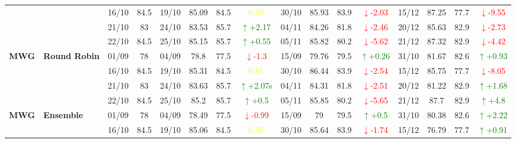 \documentclass{ieeeaccess}
\begin{document}
{\begin{longtable}{llcc|cccc|cccc|cccc}
&
& 16/10 & 84.5 & 19/10 & 85.09 & 84.5 & \textcolor{yellow}{0.59} & 30/10 & 85.93 & 83.9 & \textcolor{red}{\(\downarrow\)-2.03} & 15/12 & 87.25 & 77.7 & \textcolor{red}{\(\downarrow\)-9.55} \\

&
& 21/10 & 83 & 24/10 & 83.53 & 85.7 & \textcolor{green}{\(\uparrow\)+2.17} & 04/11 & 84.26 & 81.8 & \textcolor{red}{\(\downarrow\)-2.46} & 20/12 & 85.63 & 82.9 & \textcolor{red}{\(\downarrow\)-2.73} \\

&
& 22/10 & 84.5 & 25/10 & 85.15 & 85.7 & \textcolor{green}{\(\uparrow\)+0.55} & 05/11 & 85.82 & 80.2 & \textcolor{red}{\(\downarrow\)-5.62} & 21/12 & 87.32 & 82.9 & \textcolor{red}{\(\downarrow\)-4.42} \\
\midrule


\multirow{4}{*}{\textbf{MWG}} 
& \textbf{Round Robin}
& 01/09 & 78 & 04/09 & 78.8 & 77.5 & \textcolor{red}{\(\downarrow\)-1.3} & 15/09 & 79.76 & 79.5 & \textcolor{green}{\(\uparrow\)+0.26} & 31/10 & 81.67 & 82.6 & \textcolor{green}{\(\uparrow\)+0.93} \\

&
& 16/10 & 84.5 & 19/10 & 85.31 & 84.5 & \textcolor{yellow}{0.81} & 30/10 & 86.44 & 83.9 & \textcolor{red}{\(\downarrow\)-2.54} & 15/12 & 85.75 & 77.7 & \textcolor{red}{\(\downarrow\)-8.05} \\

&
& 21/10 & 83 & 24/10 & 83.63 & 85.7 & \textcolor{green}{\(\uparrow\)+2.07s} & 04/11 & 84.31 & 81.8 & \textcolor{red}{\(\downarrow\)-2.51} & 20/12 & 81.22 & 82.9 & \textcolor{green}{\(\uparrow\)+1.68} \\

&
& 22/10 & 84.5 & 25/10 & 85.2 & 85.7 & \textcolor{green}{\(\uparrow\)+0.5} & 05/11 & 85.85 & 80.2 & \textcolor{red}{\(\downarrow\)-5.65} & 21/12 & 87.7 & 82.9 & \textcolor{green}{\(\uparrow\)+4.8} \\
\midrule




\multirow{4}{*}{\textbf{MWG}} 
& \textbf{Ensemble}
& 01/09 & 78 & 04/09 & 78.49 & 77.5 & \textcolor{red}{\(\downarrow\)-0.99} & 15/09 & 79 & 79.5 & \textcolor{green}{\(\uparrow\)+0.5} & 31/10 & 80.38 & 82.6 & \textcolor{green}{\(\uparrow\)+2.22} \\

&
& 16/10 & 84.5 & 19/10 & 85.06 & 84.5 & \textcolor{yellow}{0.56} & 30/10 & 85.64 & 83.9 & \textcolor{red}{\(\downarrow\)-1.74} & 15/12 & 76.79 & 77.7 & \textcolor{green}{\(\uparrow\)+0.91} \\


\end{longtable}}
\end{document}
